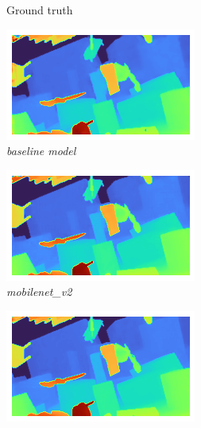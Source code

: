\documentclass[runningheads]{llncs}
\begin{document}
\begin{figure}[t]
\begin{subfigure}[h]{0.32\linewidth}
        \caption{Ground truth}
     \end{subfigure}
     \hfill
     \begin{subfigure}[h]{0.32\linewidth}
         \centering
        \includegraphics[width=\linewidth]{images/baseline_model_sceneflow.png}
        \caption{\textit{baseline model}}
     \end{subfigure}
     \hfill
     \begin{subfigure}[h]{0.32\linewidth}
         \centering
         \includegraphics[width=\linewidth]{images/mobilenet_v2_sceneflow.png}
         \caption{\textit{mobilenet\_v2}}
     \end{subfigure}
          \hfill
    \begin{subfigure}[h]{0.32\linewidth}
         \centering
         \includegraphics[width=\linewidth]{images/efficientnet-b3_sceneflow.png}

\end{subfigure}
\end{figure}
\end{document}
